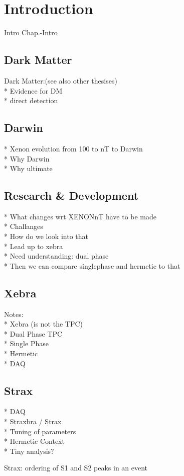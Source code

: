 \chapter{Introduction}
\label{chap:Intro}

Intro Chap.-Intro

\section{Dark Matter}
\label{sec:DarkMatter}

Dark Matter:(see also other thesises) \\
* Evidence for DM \\
* direct detection


\section{Darwin}
\label{sec:Darwin}

* Xenon evolution from 100 to nT to Darwin \\
* Why Darwin \\
* Why ultimate


\section{Research \& Development}
\label{sec:RnD}

* What changes wrt XENONnT have to be made \\
* Challanges \\
* How do we look into that \\
* Lead up to xebra \\
* Need understanding: dual phase \\
* Then we can compare singlephase and hermetic to that


\section{Xebra}
\label{sec:Xebra}

Notes: \\
* Xebra (is not the TPC) \\
* Dual Phase TPC \\
* Single Phase \\
* Hermetic \\
* DAQ

\section{Strax}
\label{sec:Strax}

* DAQ \\
* Straxbra / Strax \\
* Tuning of parameters \\
* Hermetic Context \\
* Tiny analysis?



Strax: ordering of S1 and S2 peaks in an event
